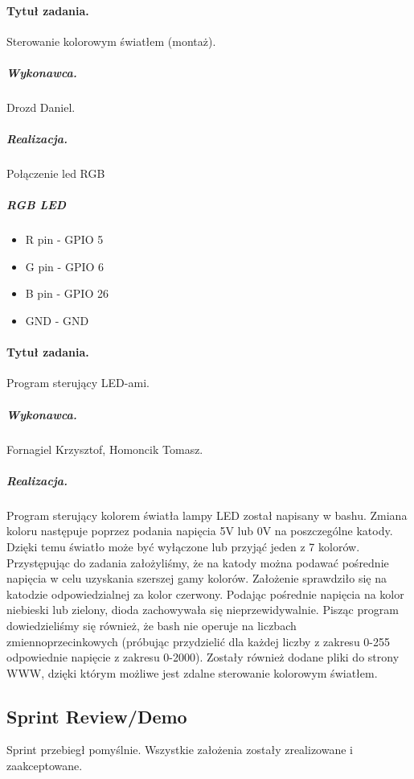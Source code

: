 \paragraph{Tytuł zadania.} Sterowanie kolorowym światłem (montaż).
\subparagraph{Wykonawca.} Drozd Daniel.
\subparagraph{Realizacja.} Połączenie led RGB
\subparagraph{RGB LED}

\begin{itemize}
	\item R pin - GPIO 5
	\item G pin - GPIO 6
	\item B pin - GPIO 26
	\item GND - GND
\end{itemize}

\paragraph{Tytuł zadania.} Program sterujący LED-ami.
\subparagraph{Wykonawca.} Fornagiel Krzysztof, Homoncik Tomasz.
\subparagraph{Realizacja.} Program sterujący kolorem światła lampy LED został napisany w bashu. Zmiana koloru następuje poprzez podania napięcia 5V lub 0V na poszczególne katody. Dzięki temu światło może być wyłączone lub przyjąć jeden z 7 kolorów. Przystępując do zadania założyliśmy, że na katody można podawać pośrednie napięcia w celu uzyskania szerszej gamy kolorów. Założenie sprawdziło się na katodzie odpowiedzialnej za kolor czerwony. Podając pośrednie napięcia na kolor niebieski lub zielony, dioda zachowywała się nieprzewidywalnie. Pisząc program dowiedzieliśmy się również, że bash nie operuje na liczbach zmiennoprzecinkowych (próbując przydzielić dla każdej liczby z zakresu 0-255 odpowiednie napięcie z zakresu 0-2000). Zostały również dodane pliki do strony WWW, dzięki którym możliwe jest zdalne sterowanie kolorowym światłem.


\subsection{Sprint Review/Demo}
Sprint przebiegł pomyślnie. Wszystkie założenia zostały zrealizowane i zaakceptowane.
